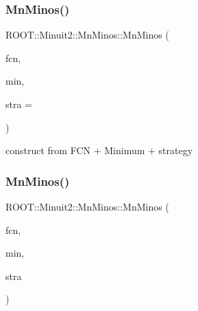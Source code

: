 \mbox{\label{classROOT_1_1Minuit2_1_1MnMinos_ac64ec75423efa6e473ee722f08f47eb4}} 
\subsubsection{\texorpdfstring{MnMinos()}{MnMinos()}\hspace{0.1cm}{\footnotesize\ttfamily [3/4]}}
{\footnotesize\ttfamily R\+O\+O\+T\+::\+Minuit2\+::\+Mn\+Minos\+::\+Mn\+Minos (\begin{DoxyParamCaption}\item[{const \mbox{\hyperlink{classROOT_1_1Minuit2_1_1FCNBase}{F\+C\+N\+Base}} \&}]{fcn,  }\item[{const \mbox{\hyperlink{classROOT_1_1Minuit2_1_1FunctionMinimum}{Function\+Minimum}} \&}]{min,  }\item[{unsigned int}]{stra = {} }\end{DoxyParamCaption})}



construct from F\+CN + Minimum + strategy 

\mbox{\label{classROOT_1_1Minuit2_1_1MnMinos_a80f912ade0dd48d937bc04b14e28623c}} 
\subsubsection{\texorpdfstring{MnMinos()}{MnMinos()}\hspace{0.1cm}{\footnotesize\ttfamily [4/4]}}
{\footnotesize\ttfamily R\+O\+O\+T\+::\+Minuit2\+::\+Mn\+Minos\+::\+Mn\+Minos (\begin{DoxyParamCaption}\item[{const \mbox{\hyperlink{classROOT_1_1Minuit2_1_1FCNBase}{F\+C\+N\+Base}} \&}]{fcn,  }\item[{const \mbox{\hyperlink{classROOT_1_1Minuit2_1_1FunctionMinimum}{Function\+Minimum}} \&}]{min,  }\item[{const \mbox{\hyperlink{classROOT_1_1Minuit2_1_1MnStrategy}{Mn\+Strategy}} \&}]{stra }\end{DoxyParamCaption})}



